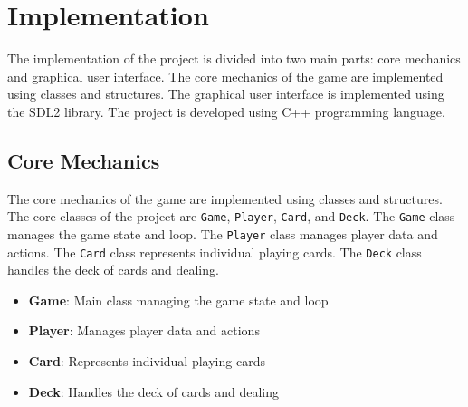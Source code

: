 \section{Implementation}
\label{sec:implementation}

\hspace{1cm} The implementation of the project is divided into two main parts: core mechanics and graphical user interface. The core mechanics of the game are implemented using classes and structures. The graphical user interface is implemented using the SDL2 library. The project is developed using C++ programming language.

\subsection{Core Mechanics}
\label{subsec:core-mechanics}

\hspace{1cm} The core mechanics of the game are implemented using classes and structures. The core classes of the project are \texttt{Game}, \texttt{Player}, \texttt{Card}, and \texttt{Deck}. The \texttt{Game} class manages the game state and loop. The \texttt{Player} class manages player data and actions. The \texttt{Card} class represents individual playing cards. The \texttt{Deck} class handles the deck of cards and dealing.

\vspace{0.5cm}

\begin{itemize}
    \item \textbf{Game}: Main class managing the game state and loop
    \item \textbf{Player}: Manages player data and actions
    \item \textbf{Card}: Represents individual playing cards
    \item \textbf{Deck}: Handles the deck of cards and dealing
\end{itemize}

\vspace{0.5cm}